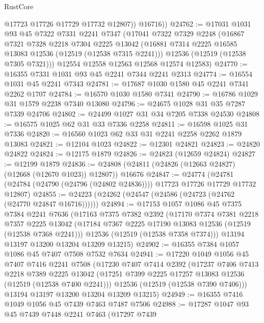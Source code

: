 \begin{lexlean}{RustCore}
\begin{coremodule}
            @17723
            @17726
            @17729
            @17732
            @12807))
        @16716))
@24762 := @17031
    @1031
    @93
    @45
    @7322
    @7331
    @2241
    @7347
    (@17041
      @7322
      @7329
      @2248
      (@16867
        @7321
        @7328
        @2218
        @7304
        @2225
        @13042
        (@16881 @7314 @2225 @16585 @13083 @12536 (@12519 (@12538 @7315 @2241)))
        @12536
        (@12519 (@12538 @7305 @7321)))
      @12554
      @12558
      @12563
      @12568
      @12574
      @12583)
@24770 := @16355 @7331 @1031 @93 @45 @2241 @7344 @2241 @2313
@24774 := @16554 @1031 @45 @2241 @7343
@24781 := @17687 @1030 @1580 @45 @2241 @7341 @2262 @1707
@24784 := @16570 @1030 @1580 @7341
@24790 := @16786 @1029 @31 @1579 @2238 @7340 @13080
@24796 := @24675 @1028 @31 @35 @7287 @7339 @24706
@24802 := @24499 @1027 @31 @34 @7205 @7338 @24530
@24808 := @16575 @1025 @62 @31 @33 @7336 @2258
@24811 := @16598 @1025 @31 @7336
@24820 := @16560 @1023 @62 @33 @31 @2241 @2258 @2262 @1879 @13083
@24821 := @12104 @1023
@24822 := @12301 @24821
@24823 := @24820 @24822
@24824 := @12175 @1879
@24826 := @24823 (@12659 @24824)
@24827 := @12199 @1879
@24836 := @24808 (@24811 (@24826 (@12663 @24827) (@12668 (@12670 @1023)) @12807)) @16676
@24847 := @24774
    (@24781 (@24784 (@24790 (@24796 (@24802 @24836)))) @17723 @17726 @17729 @17732 @12807)
@24855 := @24223 (@24262 (@24547 (@24586 (@24723 (@24762 (@24770 @24847 @16716))))))
@24894 := @17153
    @1057
    @1086
    @45
    @7375
    @7384
    @2241
    @7636
    (@17163
      @7375
      @7382
      @2392
      (@17170
        @7374
        @7381
        @2218
        @7357
        @2225
        @13042
        (@17184 @7367 @2225 @17190 @13083 @12536 (@12519 (@12538 @7368 @2241)))
        @12536
        (@12519 (@12538 @7358 @7374)))
      @13194
      @13197
      @13200
      @13204
      @13209
      @13215)
@24902 := @16355 @7384 @1057 @1086 @45 @7407 @7508 @7532 @7634
@24941 := @17220
    @1049
    @1056
    @45
    @7407
    @7416
    @2241
    @7508
    (@17230
      @7407
      @7414
      @2392
      (@17237
        @7406
        @7413
        @2218
        @7389
        @2225
        @13042
        (@17251 @7399 @2225 @17257 @13083 @12536 (@12519 (@12538 @7400 @2241)))
        @12536
        (@12519 (@12538 @7390 @7406)))
      @13194
      @13197
      @13200
      @13204
      @13209
      @13215)
@24949 := @16355 @7416 @1049 @1056 @45 @7439 @7463 @7487 @7506
@24988 := @17287
    @1047
    @93
    @45
    @7439
    @7448
    @2241
    @7463
    (@17297
      @7439

\end{coremodule}
\end{lexlean}
